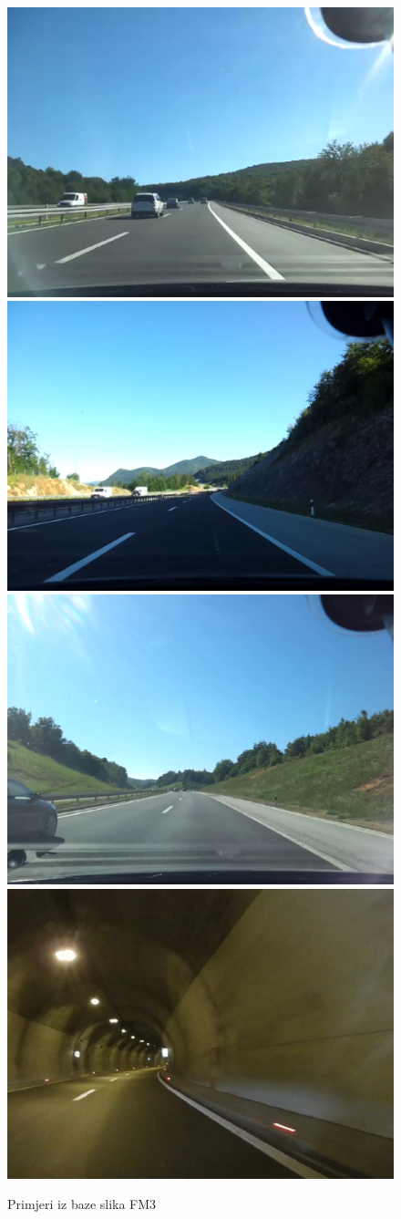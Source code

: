 \documentclass[times, utf8, diplomski]{fer}
\begin{document}
\begin{figure}[H]
\begin{center}
\includegraphics[width=.33\textwidth]{000001}
\includegraphics[width=.33\textwidth]{000855}
\includegraphics[width=.33\textwidth]{003935}
\includegraphics[width=.33\textwidth]{006437}
\end{center}
\caption{Primjeri iz baze slika FM3}
\end{figure}
\end{document}
